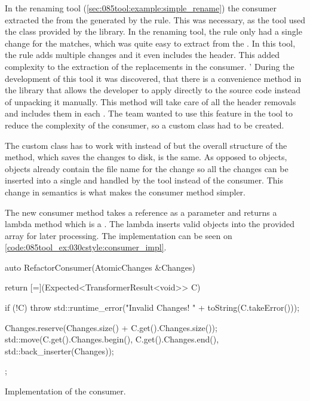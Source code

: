In the renaming tool (\cref{sec:085tool:example:simple_rename}) the  consumer extracted the  from the  generated by the rule. This was necessary, as the tool used the  class provided by the library. In the renaming tool, the rule only had a single change for the matches, which was quite easy to extract from the . In this tool, the rule adds multiple changes and it even includes the  header. This added complexity to the extraction of the replacements in the consumer. 
'
During the development of this tool it was discovered, that there is a convenience method in the library that allows the developer to apply  directly to the source code instead of unpacking it manually. This method will take care of all the header removals and includes them in each . The team wanted to use this feature in the tool to reduce the complexity of the consumer, so a custom  class had to be created.

The custom class has to work with  instead of  but the overall structure of the  method, which saves the changes to disk, is the same. As opposed to  objects, objects already contain the file name for the change so all the changes can be inserted into a single   and handled by the tool instead of the consumer. This change in semantics is what makes the consumer method simpler. 

The new consumer method takes a  reference as a parameter and returns a lambda method which is a . The lambda inserts valid  objects into the provided  array for later processing. The implementation can be seen on \cref{code:085tool_ex:030cstyle:consumer_impl}.

\begin{listing}[H]
    \begin{cppcode}
auto RefactorConsumer(AtomicChanges &Changes) {
        return [=](Expected<TransformerResult<void>> C) {
            if (!C) {
                throw std::runtime_error("Invalid Changes! " + toString(C.takeError()));
            }

            Changes.reserve(Changes.size() + C.get().Changes.size());
			std::move(C.get().Changes.begin(), C.get().Changes.end(),
			          std::back_inserter(Changes));
        };
}
    \end{cppcode}
    \caption{Implementation of the  consumer.}
    \label{code:085tool_ex:030cstyle:consumer_impl}
\end{listing}

